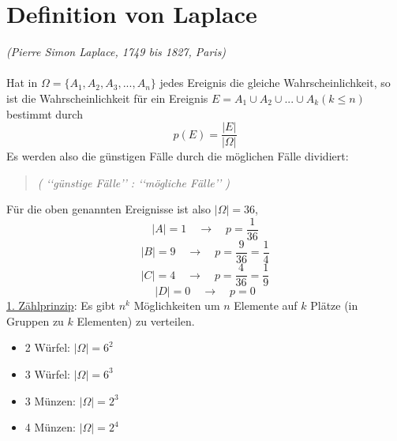 \documentclass{report}
\begin{document}
\section{Definition von Laplace}
\textit{(Pierre Simon Laplace, 1749 bis 1827, Paris)}\\\\
Hat in $\Omega = \{ A_1, A_2, A_3, ..., A_n \}$ jedes Ereignis die gleiche Wahrscheinlichkeit, so ist die Wahrscheinlichkeit für ein Ereignis $E = A_1 \cup A_2 \cup ... \cup A_k (k \leq n)$ bestimmt durch
\begin{equation}
p(E) = \frac{|E|}{|\Omega|}
\end{equation}
Es werden also die günstigen Fälle durch die möglichen Fälle dividiert:
\begin{quote}
\textit{( \lq\lq{}günstige Fälle\rq\rq{} \quad : \quad \lq\lq{}mögliche Fälle\rq\rq{} )}
\end{quote}
Für die oben genannten Ereignisse ist also $|\Omega| = 36$,
\begin{equation}
|A| = 1 \quad \longrightarrow \quad p = \frac{1}{36}
\end{equation}
\begin{equation}
|B| = 9 \quad \longrightarrow \quad p = \frac{9}{36} = \frac{1}{4}
\end{equation}
\begin{equation}
|C| = 4 \quad \longrightarrow \quad p = \frac{4}{36} = \frac{1}{9}
\end{equation}
\begin{equation}
|D| = 0 \quad \longrightarrow \quad p = 0
\end{equation}
\underline{1. Zählprinzip}: Es gibt $n^k$ Möglichkeiten um $n$ Elemente auf $k$ Plätze (in Gruppen zu $k$ Elementen) zu verteilen.
\begin{itemize}
\item 2 Würfel: $|\Omega| = 6^2$
\item 3 Würfel: $|\Omega| = 6^3$
\item 3 Münzen: $|\Omega| = 2^3$
\item 4 Münzen: $|\Omega| = 2^4$
\end{itemize}
\end{document}
